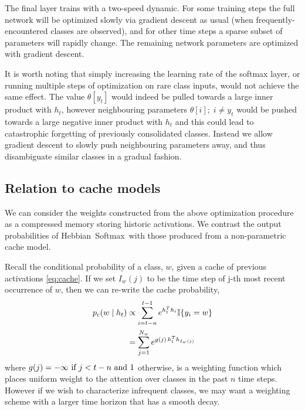 \documentclass{article} \usepackage{hyperref}
\newcommand{\model}{\hbox{Hebbian Softmax }}
\begin{document}
The final layer trains with a two-speed dynamic. For some training steps the full network will be optimized slowly via gradient descent as usual (when frequently-encountered classes are observed), and for other time steps a sparse subset of parameters will rapidly change. The remaining network parameters are optimized with gradient descent.

It is worth noting that simply increasing the learning rate of the softmax layer, or running multiple steps of optimization on rare class inputs, would not achieve the same effect. The value $\theta[y_t]$ would indeed be pulled towards a large inner product with $h_t$, however neighbouring parameters $\theta[i] ; \; i \neq y_t$ would be pushed towards a large negative inner product with $h_t$ and this could lead to catastrophic forgetting of previously consolidated classes. Instead we allow gradient descent to slowly push neighbouring parameters away, and thus disambiguate similar classes in a gradual fashion.

\subsection{Relation to cache models}
\label{sec:compressed_memory}
We can consider the weights constructed from the above optimization procedure as a compressed memory storing historic activations. We contrast the output probabilities of \model with those produced from a non-parametric cache model.

Recall the conditional probability of a class, $w$, given a cache of previous activations \eqref{eq:cache}. If we set $I_w(j)$ to be the time step of j-th most recent occurrence of $w$, then we can re-write the cache probability,
\begin{align}
\label{eq:cache_rewrite}
    p_c(w \mid h_t) & \propto \displaystyle\sum_{i = t - n}^{t - 1} e^{h_t^T h_i} \mathbb{I}\{y_i = w\} \notag \\
    & = \displaystyle\sum_{j = 1}^{N_w} e^{ g(j) \, h_t^T h_{I_w(j)}}
\end{align}
where $g(j) = -\infty \hbox{ if } j < t - n \hbox { and } 1 $ otherwise, is a weighting function which places uniform weight to the attention over classes in the past $n$ time steps. However if we wish to characterize infrequent classes, we may want a weighting scheme with a larger time horizon that has a smooth decay.
\end{document}
